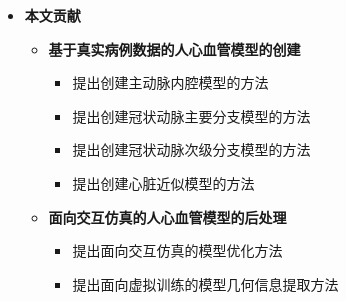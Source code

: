 \begin{frame}
\begin{itemize}
  \item \textbf{本文贡献}
  \begin{itemize}
    \item \textbf{基于真实病例数据的人心血管模型的创建}
    \begin{itemize}
      \item 提出创建主动脉内腔模型的方法
      \item 提出创建冠状动脉主要分支模型的方法
      \item 提出创建冠状动脉次级分支模型的方法
      \item 提出创建心脏近似模型的方法
    \end{itemize}
    \item \textbf{面向交互仿真的人心血管模型的后处理}
    \begin{itemize}
      \item 提出面向交互仿真的模型优化方法
      \item 提出面向虚拟训练的模型几何信息提取方法
    \end{itemize}
  \end{itemize}
\end{itemize}
\end{frame} 